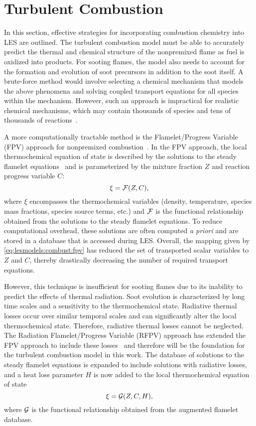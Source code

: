 \section{Turbulent Combustion}
\label{sec:lesmodels:combust}

In this section, effective strategies for incorporating combustion chemistry into LES are outlined. The turbulent combustion model must be able to accurately predict the thermal and chemical structure of the nonpremixed flame as fuel is oxidized into products. For sooting flames, the model also needs to account for the formation and evolution of soot precursors in addition to the soot itself. A brute-force method would involve selecting a chemical mechanism that models the above phenomena and solving coupled transport equations for all species within the mechanism. However, such an approach is impractical for realistic chemical mechanisms, which may contain thousands of species and tens of thousands of reactions~\cite{law2007}.

A more computationally tractable method is the Flamelet/Progress Variable (FPV) approach for nonpremixed combustion~\cite{pierce2004}. In the FPV approach, the local thermochemical equation of state is described by the solutions to the steady flamelet equations~\cite{peters1984} and is parameterized by the mixture fraction $Z$ and reaction progress variable $C$:
\begin{equation}\label{eq:lesmodels:combust:fpv}
  \xi = \mathcal{F}(Z,C),
\end{equation}
where $\xi$ encompasses the thermochemical variables (density, temperature, species mass fractions, species source terms, etc.) and $\mathcal{F}$ is the functional relationship obtained from the solutions to the steady flamelet equations. To reduce computational overhead, these solutions are often computed \textit{a priori} and are stored in a database that is accessed during LES. Overall, the mapping given by \cref{eq:lesmodels:combust:fpv} has reduced the set of transported scalar variables to $Z$ and $C$, thereby drastically decreasing the number of required transport equations.

However, this technique is insufficient for sooting flames due to its inability to predict the effects of thermal radiation. Soot evolution is characterized by long time scales and a sensitivity to the thermochemical state. Radiative thermal losses occur over similar temporal scales and can significantly alter the local thermochemical state. Therefore, radiative thermal losses cannot be neglected. The Radiation Flamelet/Progress Variable (RFPV) approach has extended the FPV approach to include these losses~\cite{ihme2008} and therefore will be the foundation for the turbulent combustion model in this work. The database of solutions to the steady flamelet equations is expanded to include solutions with radiative losses, and a heat loss parameter $H$ is now added to the local thermochemical equation of state
\begin{equation}\label{eq:lesmodels:combust:rfpv}
  \xi = \mathcal{G}(Z, C, H),
\end{equation}
where $\mathcal{G}$ is the functional relationship obtained from the augmented flamelet database.

